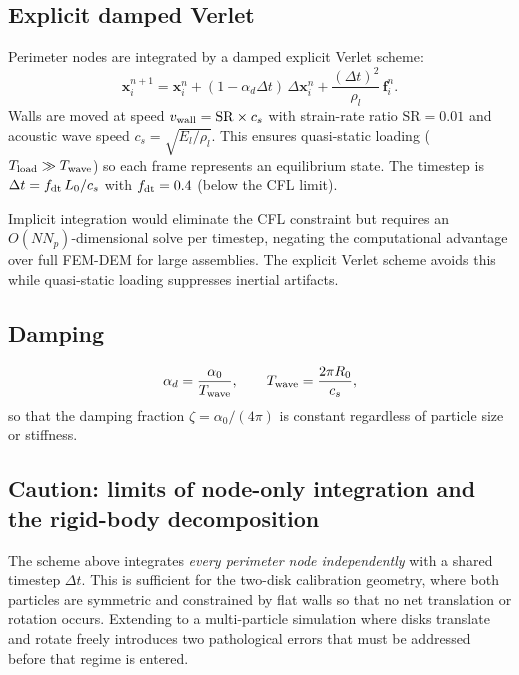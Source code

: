 \documentclass[aps,pre,twocolumn,floatfix,longbibliography]{revtex4-2}
\newcommand{\El}{E_l}
\newcommand{\SR}{\mathrm{SR}}
\begin{document}
\subsection{Explicit damped Verlet}

Perimeter nodes are integrated by a damped explicit Verlet scheme:
\begin{equation}
  \mathbf{x}_i^{n+1} = \mathbf{x}_i^n + (1-\alpha_d \Delta t)\,\Delta\mathbf{x}_i^n
  + \frac{(\Delta t)^2}{\rho_l}\,\mathbf{f}_i^n.
\label{eq:verlet}
\end{equation}
Walls are moved at speed $v_{\rm wall} = \SR \times c_s$ with strain-rate ratio
$\SR = 0.01$ and acoustic wave speed $c_s = \sqrt{\El/\rho_l}$.  This ensures
quasi-static loading ($T_{\rm load} \gg T_{\rm wave}$) so each frame represents
an equilibrium state.  The timestep is $\Delta t = f_{\rm dt}\, L_0/c_s$ with
$f_{\rm dt} = 0.4$ (below the CFL limit).

Implicit integration would eliminate the CFL constraint but requires an
$O(N N_p)$-dimensional solve per timestep, negating the computational advantage
over full FEM-DEM for large assemblies.  The explicit Verlet scheme avoids this
while quasi-static loading suppresses inertial artifacts.

\subsection{Damping}

\begin{equation}
  \alpha_d = \frac{\alpha_0}{T_{\rm wave}},
  \qquad
  T_{\rm wave} = \frac{2\pi R_0}{c_s},
\label{eq:damp}
\end{equation}
so that the damping fraction $\zeta = \alpha_0/(4\pi)$ is constant regardless
of particle size or stiffness.

\subsection{Caution: limits of node-only integration and the rigid-body
decomposition}
\label{sec:rigidlimit}

The scheme above integrates \emph{every perimeter node independently} with a
shared timestep $\Delta t$.  This is sufficient for the two-disk calibration
geometry, where both particles are symmetric and constrained by flat walls so
that no net translation or rotation occurs.  Extending to a multi-particle
simulation where disks translate and rotate freely introduces two pathological
errors that must be addressed before that regime is entered.
\end{document}
